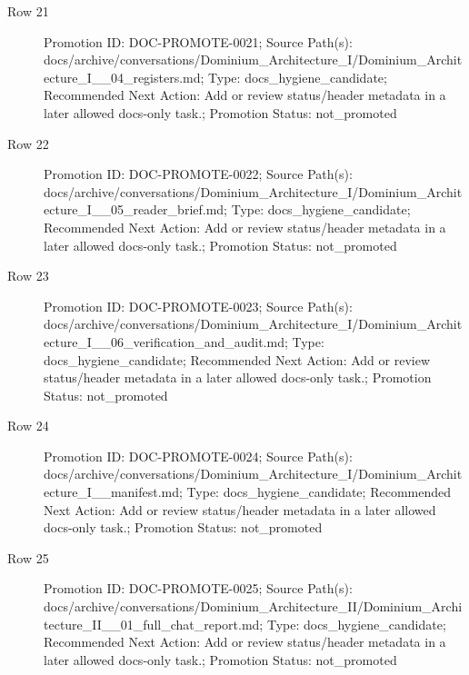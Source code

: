 \documentclass[9pt,a4paper,openany]{book}
\begin{document}
\begin{description}
\item[Row 21] Promotion ID: DOC-\allowbreak{}PROMOTE-\allowbreak{}0021; Source Path(s): docs/\allowbreak{}archive/\allowbreak{}conversations/\allowbreak{}Dominium\_\allowbreak{}Architecture\_\allowbreak{}I/\allowbreak{}Dominium\_\allowbreak{}Architecture\_\allowbreak{}I\_\allowbreak{}\_\allowbreak{}04\_\allowbreak{}registers.\allowbreak{}md; Type: docs\_\allowbreak{}hygiene\_\allowbreak{}candidate; Recommended Next Action: Add or review status/\allowbreak{}header metadata in a later allowed docs-\allowbreak{}only task.\allowbreak{}; Promotion Status: not\_\allowbreak{}promoted
\item[Row 22] Promotion ID: DOC-\allowbreak{}PROMOTE-\allowbreak{}0022; Source Path(s): docs/\allowbreak{}archive/\allowbreak{}conversations/\allowbreak{}Dominium\_\allowbreak{}Architecture\_\allowbreak{}I/\allowbreak{}Dominium\_\allowbreak{}Architecture\_\allowbreak{}I\_\allowbreak{}\_\allowbreak{}05\_\allowbreak{}reader\_\allowbreak{}brief.\allowbreak{}md; Type: docs\_\allowbreak{}hygiene\_\allowbreak{}candidate; Recommended Next Action: Add or review status/\allowbreak{}header metadata in a later allowed docs-\allowbreak{}only task.\allowbreak{}; Promotion Status: not\_\allowbreak{}promoted
\item[Row 23] Promotion ID: DOC-\allowbreak{}PROMOTE-\allowbreak{}0023; Source Path(s): docs/\allowbreak{}archive/\allowbreak{}conversations/\allowbreak{}Dominium\_\allowbreak{}Architecture\_\allowbreak{}I/\allowbreak{}Dominium\_\allowbreak{}Architecture\_\allowbreak{}I\_\allowbreak{}\_\allowbreak{}06\_\allowbreak{}verification\_\allowbreak{}and\_\allowbreak{}audit.\allowbreak{}md; Type: docs\_\allowbreak{}hygiene\_\allowbreak{}candidate; Recommended Next Action: Add or review status/\allowbreak{}header metadata in a later allowed docs-\allowbreak{}only task.\allowbreak{}; Promotion Status: not\_\allowbreak{}promoted
\item[Row 24] Promotion ID: DOC-\allowbreak{}PROMOTE-\allowbreak{}0024; Source Path(s): docs/\allowbreak{}archive/\allowbreak{}conversations/\allowbreak{}Dominium\_\allowbreak{}Architecture\_\allowbreak{}I/\allowbreak{}Dominium\_\allowbreak{}Architecture\_\allowbreak{}I\_\allowbreak{}\_\allowbreak{}manifest.\allowbreak{}md; Type: docs\_\allowbreak{}hygiene\_\allowbreak{}candidate; Recommended Next Action: Add or review status/\allowbreak{}header metadata in a later allowed docs-\allowbreak{}only task.\allowbreak{}; Promotion Status: not\_\allowbreak{}promoted
\item[Row 25] Promotion ID: DOC-\allowbreak{}PROMOTE-\allowbreak{}0025; Source Path(s): docs/\allowbreak{}archive/\allowbreak{}conversations/\allowbreak{}Dominium\_\allowbreak{}Architecture\_\allowbreak{}II/\allowbreak{}Dominium\_\allowbreak{}Architecture\_\allowbreak{}II\_\allowbreak{}\_\allowbreak{}01\_\allowbreak{}full\_\allowbreak{}chat\_\allowbreak{}report.\allowbreak{}md; Type: docs\_\allowbreak{}hygiene\_\allowbreak{}candidate; Recommended Next Action: Add or review status/\allowbreak{}header metadata in a later allowed docs-\allowbreak{}only task.\allowbreak{}; Promotion Status: not\_\allowbreak{}promoted

\end{description}
\end{document}
